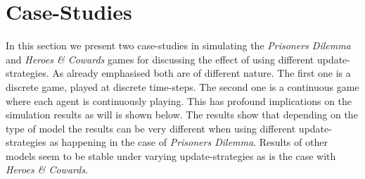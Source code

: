 \section{Case-Studies}
In this section we present two case-studies in simulating the \textit{Prisoners Dilemma} and \textit{Heroes \& Cowards} games for discussing the effect of using different update-strategies. As already emphasised both are of different nature. The first one is a discrete game, played at discrete time-steps. The second one is a continuous game where each agent is continuously playing. This has profound implications on the simulation results as will is shown below. The results show that depending on the type of model the results can be very different when using different update-strategies as happening in the case of \textit{Prisoners Dilemma}. Results of other models seem to be stable under varying update-strategies as is the case with \textit{Heroes \& Cowards}.

